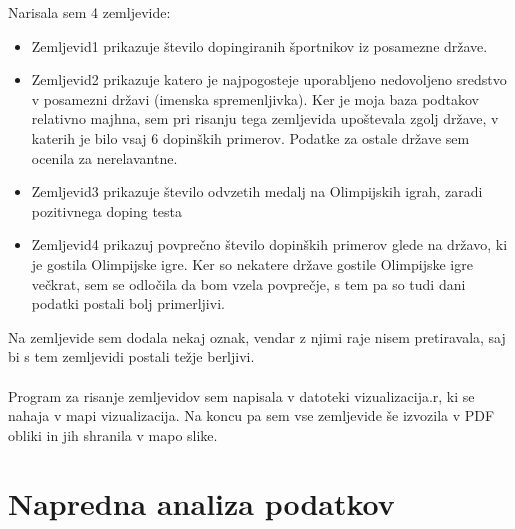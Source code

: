 \documentclass[11pt,a4paper]{article}
\begin{document}
Narisala sem 4 zemljevide:
\begin{itemize}

\item{Zemljevid1 prikazuje število dopingiranih športnikov iz posamezne države.}


\item{Zemljevid2 prikazuje katero je najpogosteje uporabljeno nedovoljeno sredstvo v posamezni državi (imenska spremenljivka).
Ker je moja baza podtakov relativno majhna, sem pri risanju tega zemljevida upoštevala zgolj države, v katerih je bilo vsaj 6 dopinških primerov. Podatke za ostale države sem ocenila za nerelavantne.}

\item{Zemljevid3 prikazuje število odvzetih medalj na Olimpijskih igrah, zaradi pozitivnega doping testa}

\item{Zemljevid4 prikazuj povprečno število dopinških primerov glede na državo, ki je gostila Olimpijske igre. 
Ker so nekatere države gostile Olimpijske igre večkrat, sem se odločila da bom vzela povprečje, s tem pa so tudi dani podatki postali bolj primerljivi.}\\
\end{itemize}
Na zemljevide sem dodala nekaj oznak, vendar z njimi raje nisem pretiravala, saj bi s tem zemljevidi postali težje berljivi.\\
\\
Program za risanje zemljevidov sem napisala v datoteki vizualizacija.r, ki se nahaja v mapi vizualizacija. 
Na koncu pa sem vse zemljevide še izvozila v PDF obliki in jih shranila v mapo slike.



\section{Napredna analiza podatkov}

\end{document}
